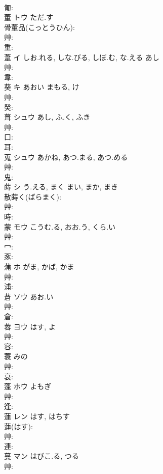 \documentclass[8pt]{extreport}
\begin{document}
\begin{CJK}{UTF8}{min}
\\	匍: 
\\	董	トウ	ただ.す		
\\	骨董品(こっとうひん): 
\\	艸: 
\\	重: 
\\	葦	イ	しお.れる, しな.びる, しぼ.む, な.える	あし	
\\	艸: 
\\	韋: 
\\	葵	キ	あおい	まもる, け	
\\	艸: 
\\	癸: 
\\	葺	シュウ	あし, ふ.く, ふき		
\\	艸: 
\\	口: 
\\	耳: 
\\	蒐	シュウ	あかね, あつ.まる, あつ.める		
\\	艸: 
\\	鬼: 
\\	蒔	シ	う.える, まく	まい, まか, まき	
\\	散蒔く(ばらまく): 
\\	艸: 
\\	時: 
\\	蒙	モウ	こうむ.る, おお.う, くら.い		
\\	艸: 
\\	冖: 
\\	豕: 
\\	蒲	ホ	がま, かば, かま		
\\	艸: 
\\	浦: 
\\	蒼	ソウ	あお.い		
\\	艸: 
\\	倉: 
\\	蓉	ヨウ		はす, よ	
\\	艸: 
\\	容: 
\\	蓑		みの			
\\	艸: 
\\	衰: 
\\	蓬	ホウ	よもぎ		
\\	艸: 
\\	逢: 
\\	蓮	レン	はす, はちす		
\\	蓮(はす): 
\\	艸: 
\\	連: 
\\	蔓	マン	はびこ.る, つる		
\\	艸: 

\end{CJK}
\end{document}
